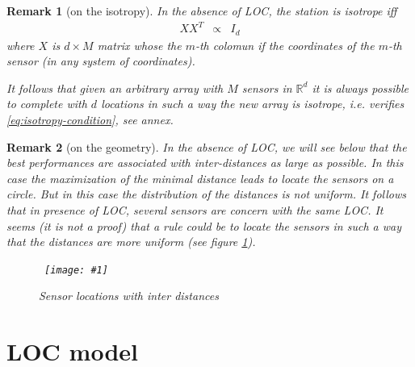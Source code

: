 \documentclass[a4paper, 12pt]{report}
\newcommand{\figscale}[4]{
\begin{figure}[hbtp]
\centerline{
    \hbox{ \texttt{[image: \#1]} }
}
\begin{center}
\parbox{12 cm}
{
    \caption{\protect\small\it  {#2}}
    \label {#3}
}
\end{center}

\end{figure}}
\newtheorem{remark}{Remark}
\begin{document}
\begin{remark}[on the isotropy]
In the absence of LOC, the station is isotrope iff 
\begin{eqnarray}
 \label{eq:isotropy-condition}
XX^{T}&\propto&I_{d}
\end{eqnarray}
where $X$ is $d\times M$ matrix whose the $m$-th colomun if the coordinates of the $m$-th sensor (in any  system of coordinates). 

It follows that  given an arbitrary array with $M$ sensors in $\mathds{R}^{d}$ it is always possible to complete with $d$ locations in such a way the new array is isotrope, i.e. verifies \eqref{eq:isotropy-condition}, see annex.

\end{remark}

\begin{remark}[on the geometry]
In the absence of LOC, we will see below that the best performances are associated with inter-distances as large as possible. In this case the maximization of the minimal distance leads to locate the sensors on a circle. But in this case the distribution of the distances is not uniform. It follows that in presence of LOC, several sensors are concern with the same LOC. It seems (it is not a proof) that a rule could be to locate the sensors in such a way that the distances are more uniform (see figure \ref{fig:uniforinterdistances}).

\figscale{../figures/uniforinterdistances.pdf}{Sensor locations with inter distances}{fig:uniforinterdistances}{0.9}

\end{remark}


\newpage\clearpage
 \section{LOC model}
\end{document}
